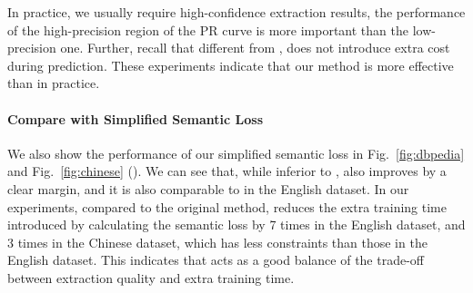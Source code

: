 
In practice, we usually require high-confidence extraction results, the performance of the high-precision region of the PR curve is more important than the low-precision one.
Further, recall that different from \ILP, \SL does not introduce extra cost during prediction.
These experiments indicate that our \SL method is more effective than \ILP in practice.
\paragraph{Compare with Simplified Semantic Loss}


We also show the performance of our simplified semantic loss in Fig.~\ref{fig:dbpedia} and Fig.~\ref{fig:chinese} (\SLsimple).
We can see that, while inferior to \SL, \SLsimple also improves \base by a clear margin, and it is also comparable to \ILP in the English dataset.
In our experiments, compared to the original \SL method, \SLsimple reduces the extra training time introduced by calculating the semantic loss by 7 times in the English dataset, and 3 times in the Chinese dataset, which has less constraints than those in the English dataset.
This indicates that \SLsimple acts as a good balance of the trade-off between extraction quality and extra training time.


